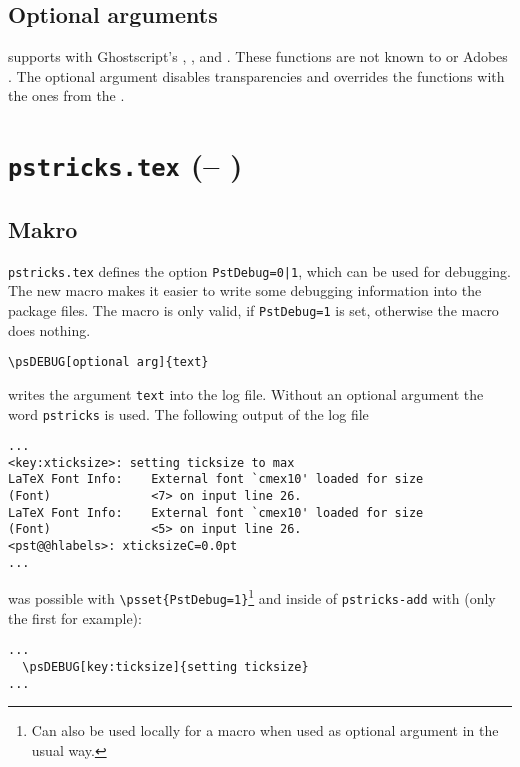 \documentclass[11pt]{article}
\begin{document}
\subsection{Optional arguments}
 supports  with Ghostscript's ,
, and . These functions are not known to
 or Adobes . The optional argument  disables transparencies
and  overrides the  functions with the ones from the .



\clearpage
\section{\texttt{pstricks.tex} (\PSTfileversion -- \PSTfiledate)}

\subsection{Makro }
\texttt{pstricks.tex} defines the option \texttt{PstDebug=0|1}, which can be used for 
debugging. The new macro  makes it easier to write some debugging
information into the package files. The macro is only valid, if \texttt{PstDebug=1}
is set, otherwise the macro does nothing.

\begin{verbatim}
\psDEBUG[optional arg]{text}
\end{verbatim}

 writes the argument \texttt{text} into the log file.
Without an optional argument the word \texttt{pstricks} is used. The following output 
of the log file 

\begin{lstlisting}
...
<key:xticksize>: setting ticksize to max
LaTeX Font Info:    External font `cmex10' loaded for size
(Font)              <7> on input line 26.
LaTeX Font Info:    External font `cmex10' loaded for size
(Font)              <5> on input line 26.
<pst@@hlabels>: xticksizeC=0.0pt
...
\end{lstlisting}

was possible with \verb+\psset{PstDebug=1}+\footnote{Can also be used locally for a macro when used as optional argument
in the usual way.} 
and inside of \texttt{pstricks-add} with 
(only the first for example):
\begin{lstlisting}
...
  \psDEBUG[key:ticksize]{setting ticksize}
...
\end{lstlisting}
\end{document}
